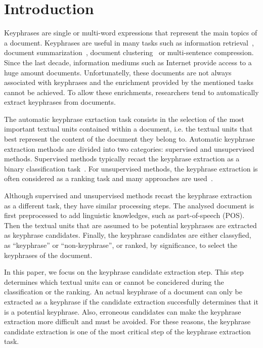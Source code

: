 \section{Introduction}
\label{sec:section}
  Keyphrases are single or multi-word expressions that represent the main topics
  of a document. Keyphrases are useful in many tasks such as information
  retrieval~\cite{medelyan2008smalltrainingset}, document
  summarization~\cite{avanzo2005keyphrase}, document
  clustering~\cite{han2007webdocumentclustering} or multi-sentence compression.
  Since the last decade, information mediums such as Internet provide access to
  a huge amount documents. Unfortunatelly, these documents are not always
  associated with keyphrases and the enrichment provided by the mentioned tasks
  cannot be achieved. To allow these enrichments, researchers tend to
  automatically extract keyphrases from documents.

  The automatic keyphrase exrtaction task consists in the selection of the most
  important textual units contained within a document, i.e. the textual units
  that best represent the content of the document they belong to. Automatic
  keyphrase extraction methods are divided into two categories: supervised and
  unsupervised methods. Supervised methods typically recast the keyphrase
  extraction as a binary classification task~\cite{witten1999kea}. For
  unsupervised methods, the keyphrase extraction is often considered as a
  ranking task and many approaches are
  used~\cite{barker2000nounphrasehead,mihalcea2004textrank}.

  Although supervised and unsupervised methods recast the keyphrase extraction
  as a different task, they have similar processing steps. The analysed document
  is first preprocessed to add linguistic knowledges, such as part-of-speech
  (POS). Then the textual units that are assumed to be potential keyphrases are
  extracted as keyphrase candidates. Finally, the keyphrase candidates are
  either classyfied, as ``keyphrase'' or ``non-keyphrase'', or ranked, by
  significance, to select the keyphrases of the document.
  
  In this paper, we focus on the keyphrase candidate extraction step. This step
  determines which textual units can or cannot be concidered during the
  classification or the ranking. An actual keyphrase of a document can only be
  extracted as a keyphrase if the candidate extraction succesfully determines
  that it is a potential keyphrase. Also, erroneous candidates can make the
  keyphrase extraction more difficult and must be avoided. For these reasons,
  the keyphrase candidate extraction is one of the most critical step of the
  keyphrase extraction task.

